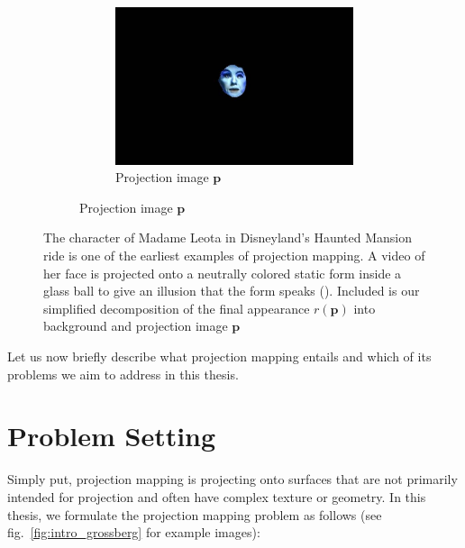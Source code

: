 \begin{figure}
\begin{subfigure}{0.3\textwidth}
        \begin{subfigure}{\textwidth}
            \centering
            \includegraphics[width=\textwidth]{images/01-Leota-only_head.jpg}
            \caption{Projection image \(\bm{p}\)}
        \end{subfigure}
    \end{subfigure}
    \caption{The character of Madame Leota in Disneyland's Haunted Mansion ride is one of the earliest examples of projection mapping. A video of her face is projected onto a neutrally colored static form inside a glass ball to give an illusion that the form speaks (\citet{MadameLeota}). Included is our simplified decomposition of the final appearance \(r(\bm{p})\) into background and projection image \(\bm{p}\)}
    \label{fig:intro_example_leota}
\end{figure}

Let us now briefly describe what projection mapping entails and which of its problems we aim to address in this thesis.

\section{Problem Setting}
\label{section:intro-problem_setting}

Simply put, projection mapping is projecting onto surfaces that are not primarily intended for projection and often have complex texture or geometry. In this thesis, we formulate the projection mapping problem as follows (see fig.~\ref{fig:intro_grossberg} for example images):

